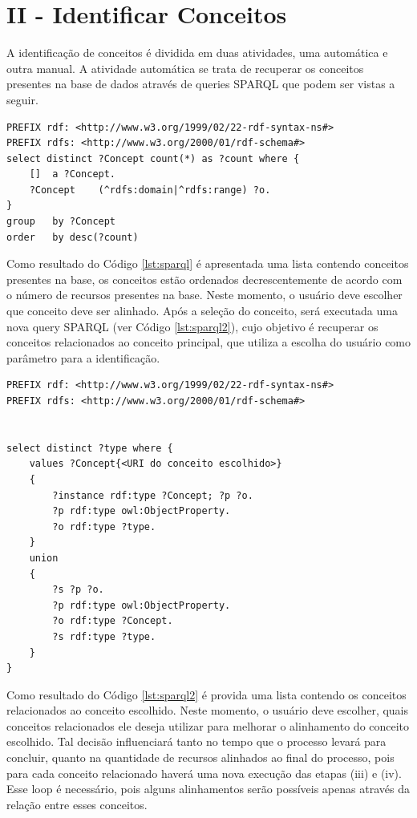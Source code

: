 \section*{II - Identificar Conceitos}
A identificação de conceitos é dividida em duas atividades, uma automática e outra manual. A atividade automática se trata de recuperar os conceitos presentes na base de dados através de queries SPARQL que podem ser vistas a seguir.
\\
\begin{lstlisting}[captionpos=b, caption=Query SPARQL para identificação de conceito, label=lst:sparql,
   basicstyle=\ttfamily,frame=single]
PREFIX rdf: <http://www.w3.org/1999/02/22-rdf-syntax-ns#>
PREFIX rdfs: <http://www.w3.org/2000/01/rdf-schema#>
select distinct ?Concept count(*) as ?count where {
	[] 	a ?Concept.
	?Concept 	(^rdfs:domain|^rdfs:range) ?o.
}
group 	by ?Concept	
order 	by desc(?count)
\end{lstlisting}

Como resultado do Código \ref{lst:sparql} é apresentada uma lista contendo conceitos presentes na base, os conceitos estão ordenados decrescentemente de acordo com o número de recursos presentes na base. Neste momento, o usuário deve escolher que conceito deve ser alinhado. Após a seleção do conceito, será executada uma nova query SPARQL (ver Código \ref{lst:sparql2}), cujo objetivo é recuperar os conceitos relacionados ao conceito principal, que utiliza a escolha do usuário como parâmetro para a identificação.

\begin{lstlisting}[captionpos=b, caption=Query SPARQL para recuperação de conceitos relacionados, label=lst:sparql2,
   basicstyle=\ttfamily,frame=single]
PREFIX rdf: <http://www.w3.org/1999/02/22-rdf-syntax-ns#>
PREFIX rdfs: <http://www.w3.org/2000/01/rdf-schema#>


select distinct ?type where {
	values ?Concept{<URI do conceito escolhido>}
	{
		?instance rdf:type ?Concept; ?p ?o.
		?p rdf:type owl:ObjectProperty.
		?o rdf:type ?type.
	}
	union
	{
		?s ?p ?o.
		?p rdf:type owl:ObjectProperty.
		?o rdf:type ?Concept.
		?s rdf:type ?type.
	}
}

\end{lstlisting}

Como resultado do Código \ref{lst:sparql2} é provida uma lista contendo os conceitos relacionados ao conceito escolhido. Neste momento, o usuário deve escolher, quais conceitos relacionados ele deseja utilizar para melhorar o alinhamento do conceito escolhido. Tal decisão influenciará tanto no tempo que o processo levará para concluir, quanto na quantidade de recursos alinhados ao final do processo, pois para cada conceito relacionado haverá uma nova execução das etapas (iii) e (iv). Esse loop é necessário, pois alguns alinhamentos serão possíveis apenas através da relação entre esses conceitos.

